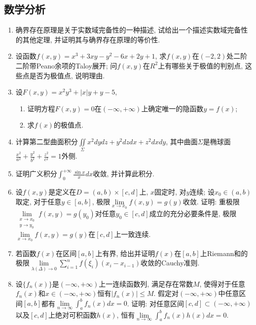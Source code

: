 \documentclass[12pt,a4paper,openany]{book}
\begin{document}
\subsection{数学分析}
\begin{enumerate}
\item 确界存在原理是关于实数域完备性的一种描述, 试给出一个描述实数域完备性的其他定理, 并证明其与确界存在原理的等价性.

\item 设函数$f(x, y) = x^3 + 3xy - y^2 - 6x + 2y + 1$, 求$f(x, y)$在$(-2, 2)$处二阶二阶带Peano余项的Taloy展开; 问$f(x, y)$在$R^2$上有哪些关于极值的判别点, 这些点是否为极值点, 说明理由.

\item 设$F(x, y) = x^2y^3 + |x|y + y -5$,
\begin{enumerate}
\item 证明方程$F(x, y) = 0$在$(-\infty, +\infty)$上确定唯一的隐函数$y = f(x)$;
\item 求$f(x)$的极值点.
\end{enumerate}

\item 计算第二型曲面积分$\displaystyle\iint\limits_{\Sigma}{x^2dydz + y^2dzdx + z^2dxdy}$, 其中曲面$\Sigma$是椭球面$\displaystyle\frac{x^2}{a^2} + \frac{y^2}{b^2} + \frac{z^2}{c^2} = 1$外侧.

\item 证明广义积分$\displaystyle\int_{0}^{+\infty}{\frac{\sin{x}}{x}dx}$收敛, 并计算此积分.

\item 设$f(x, y)$是定义在$D = (a, b) \times [c, d]$上, $x$固定时, 对$y$连续; 设$x_0 \in (a, b)$取定, 对于任意$y \in [a, b]$, 极限$\lim\limits_{x \rightarrow x_0}{f(x, y)} = g(y)$收敛. 证明: 重极限$\lim\limits_{\substack{x \rightarrow x_0 \\ y \rightarrow y_0}}{f(x, y)} = g(y_0)$对任意$y_0 \in [c, d]$成立的充分必要条件是, 极限$\lim\limits_{x \rightarrow x_0}{f(x, y)} = g(y)$在$[c, d]$上一致连续.

\item 若函数$f(x)$在区间$[a, b]$上有界, 给出并证明$f(x)$在$[a, b]$上Riemann和的极限$\lim\limits_{\lambda{(\Delta)} \rightarrow 0}{\sum\limits_{i=1}^{n}{f(\xi_i)(x_i - x_{i-1})}}$收敛的Cauchy准则.

\item 设$\{f_n(x)\}$是$(-\infty, +\infty)$上一连续函数列, 满足存在常数$M$, 使得对于任意$f_n(x)$和$x \in (-\infty, +\infty)$恒有$|f_n(x)| \le M$. 假定对$(-\infty, +\infty)$中任意区间$[a, b]$都有$\lim\limits_{n \rightarrow \infty}{\displaystyle\int_{a}^{b}{f_n(x)dx}} = 0$. 证明: 对任意区间$[c, d] \subset (-\infty, +\infty)$以及$[c, d]$上绝对可积函数$h(x)$, 恒有$\lim\limits_{n \rightarrow \infty}{\displaystyle\int_{a}^{b}{f_n(x)h(x)dx}} = 0$.


\end{enumerate}
\end{document}
